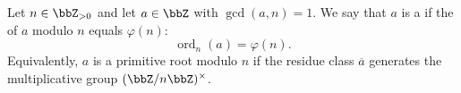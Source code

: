 \begin{definition} \label{definition:primitive_root_modulo_n}
    Let $n \in \bbZ_{>0}$ and let $a \in \bbZ$ with $\gcd(a, n) = 1$. We say that $a$ is a  if the  of $a$ modulo $n$ equals $\varphi(n)$:
    $$\operatorname{ord}_n(a) = \varphi(n).$$
    Equivalently, $a$ is a primitive root modulo $n$ if the residue class $\overline{a}$ generates the multiplicative group $(\bbZ / n\bbZ)^\times$.
\end{definition}
